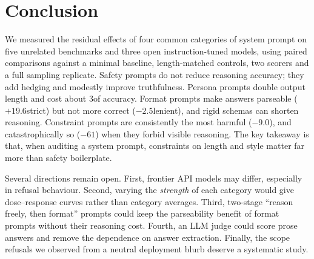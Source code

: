 \section{Conclusion}
\label{sec:conclusion}

We measured the residual effects of four common categories of system prompt on five unrelated benchmarks and three open instruction-tuned models, using paired comparisons against a minimal baseline, length-matched controls, two scorers and a full sampling replicate. Safety prompts do not reduce reasoning accuracy; they add hedging and modestly improve truthfulness. Persona prompts double output length and cost about 3\pp of accuracy. Format prompts make answers parseable ($+19.6$\pp strict) but not more correct ($-2.5$\pp lenient), and rigid schemas can shorten reasoning. Constraint prompts are consistently the most harmful ($-9.0$\pp), and catastrophically so ($-61$\pp) when they forbid visible reasoning. The key takeaway is that, when auditing a system prompt, constraints on length and style matter far more than safety boilerplate.

Several directions remain open. First, frontier API models may differ, especially in refusal behaviour. Second, varying the {\em strength} of each category would give dose--response curves rather than category averages. Third, two-stage ``reason freely, then format'' prompts could keep the parseability benefit of format prompts without their reasoning cost. Fourth, an LLM judge could score prose answers and remove the dependence on answer extraction. Finally, the scope refusals we observed from a neutral deployment blurb deserve a systematic study.
